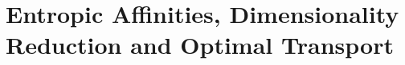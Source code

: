 
\section{Entropic Affinities, Dimensionality Reduction and Optimal Transport}\label{sec:background}








